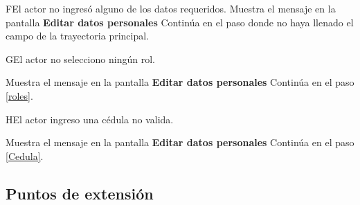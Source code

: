 \begin{UCtrayectoriaA}{F}{El actor no ingresó alguno de los datos requeridos.}
	\UCpaso[\UCsist] Muestra el mensaje  en la pantalla \textbf{Editar datos personales}
	\UCpaso[] Continúa en el paso donde no haya llenado el campo de la trayectoria principal.
\end{UCtrayectoriaA}

\begin{UCtrayectoriaA}{G}{El actor no selecciono ningún rol.}
	
	\UCpaso[\UCsist] Muestra el mensaje en la pantalla \textbf{Editar datos personales}
	\UCpaso[] Continúa en el paso \ref{roles}.
	
\end{UCtrayectoriaA}


\begin{UCtrayectoriaA}{H}{El actor ingreso una cédula no valida.}
	
	\UCpaso[\UCsist] Muestra el mensaje en la pantalla \textbf{Editar datos personales}
	\UCpaso[] Continúa en el paso \ref{Cedula}.
	
\end{UCtrayectoriaA}
 
\subsection{Puntos de extensión}



 

